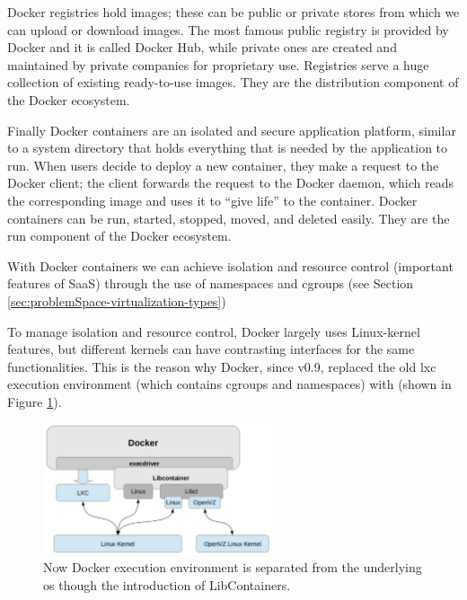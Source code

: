Docker registries hold images; these can be public or private stores from which we can upload or
download images. The most famous public registry is provided by Docker and it is called Docker Hub, while
private ones are created and maintained by private companies for proprietary use. Registries serve a
huge collection of existing ready-to-use images. They are the distribution component of the Docker
ecosystem.

Finally Docker containers are an isolated and secure application platform, similar to a system directory
that holds everything that is needed by the application to run. When users decide to deploy a new
container, they make a request to the Docker client; the client forwards the request to the Docker
daemon, which reads the corresponding image and uses it to “give life” to the container. Docker containers
can be run, started, stopped, moved, and deleted easily. They are the run component of the Docker ecosystem.

With Docker containers we can achieve isolation and resource control (important features of SaaS)
through the use of namespaces and cgroups (see Section \ref{sec:problemSpace-virtualization-types})

To manage isolation and resource control, Docker largely uses Linux-kernel features, but different kernels
can have contrasting interfaces for the same functionalities. This is the reason why Docker, since v0.9,
replaced the old \ac{lxc} execution environment (which contains cgroups and namespaces) with
 (shown in Figure \ref{img:problemSpace-docker-architecture-libcontainer}).

\begin{figure}
	\centering{}
	\includegraphics[width=0.6\textwidth]{chapters/problem/images/libcontainer.png}
	\caption[Docker libcontainer overview]{Now Docker execution environment is separated from the underlying
		\acs{os} though the introduction of LibContainers.}
	\label{img:problemSpace-docker-architecture-libcontainer}
\end{figure}

